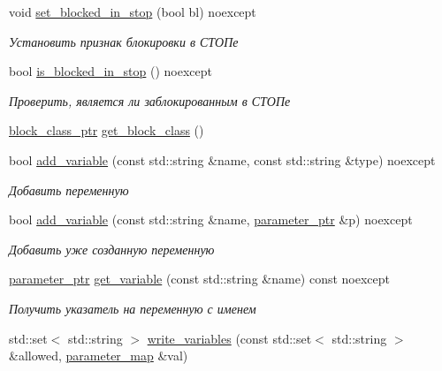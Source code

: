 \begin{DoxyCompactItemize}
\item 
void \hyperlink{classLIBKMS__namespace_1_1Block_a7b987f3386282af15cce3ca7b6a6de96}{set\-\_\-blocked\-\_\-in\-\_\-stop} (bool bl) noexcept
\begin{DoxyCompactList}\small\item\em Установить признак блокировки в СТОПе \end{DoxyCompactList}\item 
bool \hyperlink{classLIBKMS__namespace_1_1Block_a237c80b9eda1709cd50ded2320a11c94}{is\-\_\-blocked\-\_\-in\-\_\-stop} () noexcept
\begin{DoxyCompactList}\small\item\em Проверить, является ли заблокированным в СТОПе \end{DoxyCompactList}\item 
\hyperlink{classLIBKMS__namespace_1_1Block_ae813a32e603fb01d7e86ef4afcdc91ae}{block\-\_\-class\-\_\-ptr} \hyperlink{classLIBKMS__namespace_1_1Block_a045a7ef5cf8f38f1cdd9e88f833b4df8}{get\-\_\-block\-\_\-class} ()
\item 
bool \hyperlink{classLIBKMS__namespace_1_1Block_ac4c34ca843fa50683bf6f67eaa5de7c7}{add\-\_\-variable} (const std\-::string \&name, const std\-::string \&type) noexcept
\begin{DoxyCompactList}\small\item\em Добавить переменную \end{DoxyCompactList}\item 
bool \hyperlink{classLIBKMS__namespace_1_1Block_a11ceb4187857e178a1fbe21fb5bbe3bf}{add\-\_\-variable} (const std\-::string \&name, \hyperlink{classLIBKMS__namespace_1_1Block_ac67e65c4f0bd77566768ec64e25382b6}{parameter\-\_\-ptr} \&p) noexcept
\begin{DoxyCompactList}\small\item\em Добавить уже созданную переменную \end{DoxyCompactList}\item 
\hyperlink{classLIBKMS__namespace_1_1Block_ac67e65c4f0bd77566768ec64e25382b6}{parameter\-\_\-ptr} \hyperlink{classLIBKMS__namespace_1_1Block_a865fb12a0800ec98c6ccdbc114051b74}{get\-\_\-variable} (const std\-::string \&name) const noexcept
\begin{DoxyCompactList}\small\item\em Получить указатель на переменную с именем \end{DoxyCompactList}\item 
std\-::set$<$ std\-::string $>$ \hyperlink{classLIBKMS__namespace_1_1Block_a4b04254ca77c0d2f34d76d45b8e297d2}{write\-\_\-variables} (const std\-::set$<$ std\-::string $>$ \&allowed, \hyperlink{classLIBKMS__namespace_1_1Block_a8d67012b101494c21dee73cd82a1e99f}{parameter\-\_\-map} \&val)

\end{DoxyCompactItemize}
